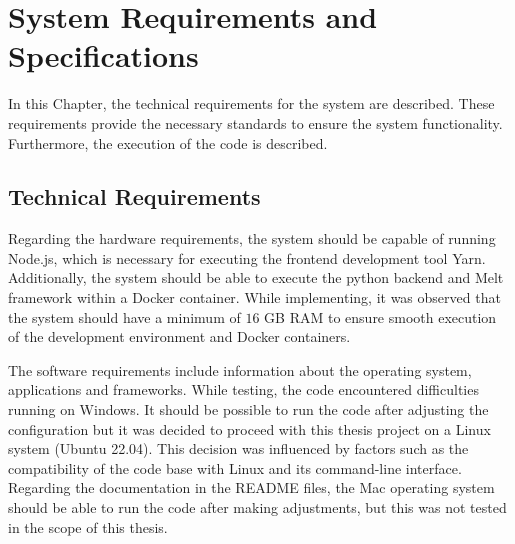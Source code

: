 \documentclass[../MasterThesis.tex]{subfiles}
\begin{document}
	
	
	

%
%
%
%
%
%
%
%
\newpage
\section{System Requirements and Specifications} \label{section:systemrequirementsandspecifications}




In this Chapter, the technical requirements for the system are described. These requirements provide the necessary standards to ensure the system functionality. Furthermore, the execution of the code is described.




\subsection{Technical Requirements} \label{subsection:technicalrequirements}



Regarding the hardware requirements, the system should be capable of running Node.js, which is necessary for executing the frontend development tool Yarn. Additionally, the system should be able to execute the python backend and Melt framework within a Docker container.
While implementing, it was observed that the system should have a minimum of $16$ GB RAM to ensure smooth execution of the development environment and Docker containers.



The software requirements include information about the operating system, applications and frameworks.
While testing, the code encountered difficulties running on Windows. It should be possible to run the code after adjusting the configuration but it was decided to proceed with this thesis project on a Linux system (Ubuntu 22.04). This decision was influenced by factors such as the compatibility of the code base with Linux and its command-line interface.
Regarding the documentation in the README files, the Mac operating system should be able to run the code after making adjustments, but this was not tested in the scope of this thesis.
\end{document}
